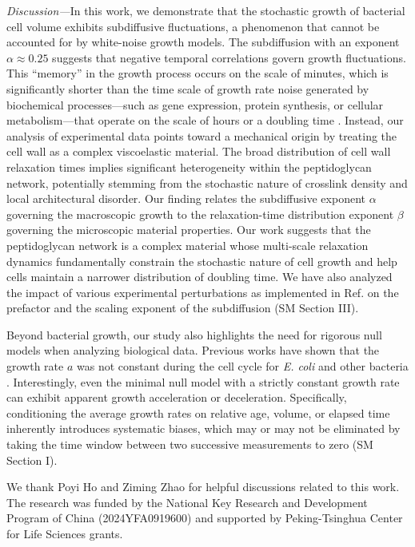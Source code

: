 \documentclass[aps, prl, twocolumn, longbibliography, linenumbers, superscriptaddress]{revtex4-2}
\begin{document}
{\it Discussion---}In this work, we demonstrate that the stochastic growth of bacterial cell volume exhibits subdiffusive fluctuations, a phenomenon that cannot be accounted for by white-noise growth models. The subdiffusion with an exponent $\alpha \approx 0.25$ suggests that negative temporal correlations govern growth fluctuations. This ``memory'' in the growth process occurs on the scale of minutes, which is significantly shorter than the time scale of growth rate noise generated by biochemical processes—such as gene expression, protein synthesis, or cellular metabolism—that operate on the scale of hours or a doubling time \cite{Kiviet2014stochasticity}. Instead, our analysis of experimental data points toward a mechanical origin by treating the cell wall as a complex viscoelastic material. The broad distribution of cell wall relaxation times implies significant heterogeneity within the peptidoglycan network, potentially stemming from the stochastic nature of crosslink density and local architectural disorder. Our finding relates the subdiffusive exponent $\alpha$ governing the macroscopic growth to the relaxation-time distribution exponent $\beta$ governing the microscopic material properties. Our work suggests that the peptidoglycan network is a complex material whose multi-scale relaxation dynamics fundamentally constrain the stochastic nature of cell growth and help cells maintain a narrower distribution of doubling time. We have also analyzed the impact of various experimental perturbations as implemented in Ref. \cite{Mukherjee2025bacterial} on the prefactor and the scaling exponent of the subdiffusion (SM Section III).

Beyond bacterial growth, our study also highlights the need for rigorous null models when analyzing biological data. Previous works have shown that the growth rate $a$ was not constant during the cell cycle for {\it E. coli} and other bacteria \cite{Kar2021distinguishing, Cylke2023super, Cylke2025gene}. Interestingly, even the minimal null model with a strictly constant growth rate can exhibit apparent growth acceleration or deceleration. Specifically, conditioning the average growth rates on relative age, volume, or elapsed time inherently introduces systematic biases, which may or may not be eliminated by taking the time window between two successive measurements to zero (SM Section I).

\begin{acknowledgments}
	We thank Poyi Ho and Ziming Zhao for helpful discussions related to this work. The research was funded by the National Key Research and Development Program of China (2024YFA0919600) and supported by Peking-Tsinghua Center for Life Sciences grants.
\end{acknowledgments}
\end{document}

